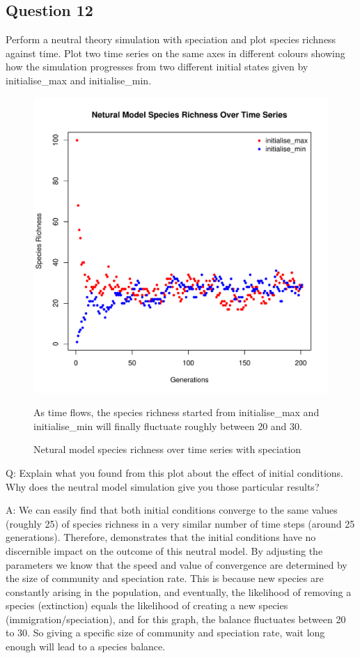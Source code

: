 \documentclass[12pt]{article}
\begin{document}
\subsection{Question 12}
Perform a neutral theory simulation with speciation and plot species richness against time. Plot two time series on the same axes in different colours showing how the simulation progresses from two different initial states given by initialise\_max and initialise\_min.

\begin{figure}[!ht]
\centering 
\includegraphics[width = 0.6\hsize]{../../results/Question12.pdf} 
\caption{Netural model species richness over time series with speciation}
As time flows, the species richness started from initialise\_max and initialise\_min will finally fluctuate roughly between 20 and 30.
\end{figure}

Q: Explain what you found from this plot about the effect of initial conditions. Why does the neutral model simulation give you those particular results?

A: We can easily find that both initial conditions converge to the same values (roughly 25) of species richness in a very similar number of time steps (around 25 generations). Therefore, demonstrates that the initial conditions have no discernible impact on the outcome of this neutral model. By adjusting the parameters we know that the speed and value of convergence are determined by the size of community and speciation rate. This is because new species are constantly arising in the population, and eventually, the likelihood of removing a species (extinction) equals the likelihood of creating a new species (immigration/speciation), and for this graph, the balance fluctuates between 20 to 30. So giving a specific size of community and speciation rate, wait long enough will lead to a species balance.
\end{document}
